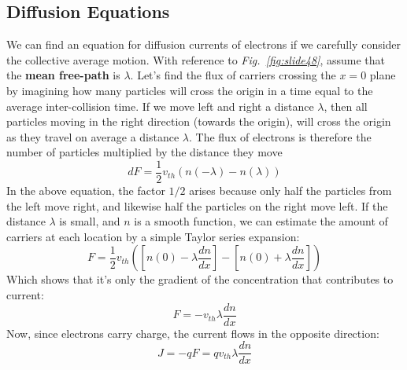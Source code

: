 \subsection{Diffusion Equations}
We can find an equation for diffusion currents of electrons if we carefully consider the collective average motion.  With reference to \emph{Fig.~\ref{fig:slide48}}, assume that the \textbf{mean free-path} is $\lambda$.  Let’s find the flux of carriers crossing the $x=0$ plane by imagining how many particles will cross the origin in a time equal to the average inter-collision time.  If we move left and right a distance $\lambda$, then all particles moving in the right direction (towards the origin), will cross the origin as they travel on average a distance $\lambda$.  The flux of electrons is therefore the number of particles multiplied by the distance they move
    \begin{equation}
        dF = \frac{1}{2}{v_{th}}\left( {n( - \lambda) - n(\lambda)} \right)
    \end{equation}
In the above equation, the factor $1/2$ arises because only half the particles from the left move right, and likewise half the particles on the right move left.  If the distance $\lambda$ is small, and $n$ is a smooth function, we can estimate the amount of carriers at each location by a simple Taylor series expansion:
    \begin{equation}
        F = \frac{1}{2}{v_{th}}\left( {\left[ {n(0) - \lambda \frac{{dn}}{{dx}}} \right]
            - \left[ {n(0) + \lambda \frac{{dn}}{{dx}}} \right]} \right)
    \end{equation}
Which shows that it’s only the gradient of the concentration that contributes to current:
    \begin{equation}
        F =  - {v_{th}}\lambda \frac{{dn}}{{dx}}
    \end{equation}
Now, since electrons carry charge, the current flows in the opposite direction:
    \begin{equation}
        J = - qF = q{v_{th}}\lambda \frac{{dn}}{{dx}}
    \end{equation}
